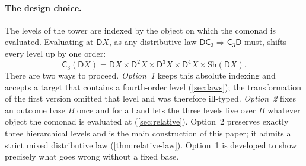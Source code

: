 \documentclass[11pt]{article}
\theoremstyle{definition}
\theoremstyle{remark}
\newcommand{\D}{\mathsf{D}}
\newcommand{\Sh}{\mathrm{Sh}}
\newcommand{\C}{\mathsf{C}}
\begin{document}
\paragraph{The design choice.} The levels of the tower are indexed by the object on which the
comonad is evaluated. Evaluating at $\D X$, as any distributive law $\D\C_3\Rightarrow\C_3\D$ must,
shifts every level up by one order:
\[
\C_3(\D X)=\D X\times\D^2X\times\D^3X\times\D^4X\times\Sh(\D X).
\]
There are two ways to proceed. \emph{Option~1} keeps this absolute indexing and accepts a target that
contains a fourth-order level (\cref{sec:laws}); the transformation of the first version omitted that
level and was therefore ill-typed. \emph{Option~2} fixes an outcome base $B$ once and for all and lets
the three levels live over $B$ whatever object the comonad is evaluated at (\cref{sec:relative}).
Option~2 preserves exactly three hierarchical levels and is the main construction of this paper; it
admits a strict mixed distributive law (\cref{thm:relative-law}). Option~1 is developed to show
precisely what goes wrong without a fixed base.
\end{document}
